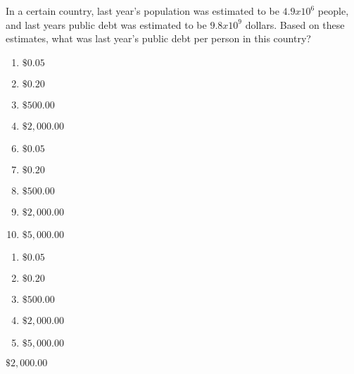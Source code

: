 In a certain country, last year's population was estimated to be $4.9x10^6$ people, and last years public debt was estimated to be $9.8x10^9$ dollars. Based on these estimates, what was last year's public debt per person in this country?

\ifsat
	\begin{enumerate}[label=\Alph*)]
		\item   $\$0.05$
		\item  $\$0.20$ 
		\item  $\$500.00$ 
		\item  $\$2,000.00$ %
	\end{enumerate}
\else
\fi

\ifacteven
	\begin{enumerate}[label=\textbf{\Alph*.},itemsep=\fill,align=left]
		\setcounter{enumii}{5}
		\item   $\$0.05$
		\item  $\$0.20$ 
		\item  $\$500.00$ 
		\addtocounter{enumii}{1}
		\item  $\$2,000.00$ %
		\item  $\$5,000.00$ 
	\end{enumerate}
\else
\fi

\ifactodd
	\begin{enumerate}[label=\textbf{\Alph*.},itemsep=\fill,align=left]
		\item   $\$0.05$
		\item  $\$0.20$ 
		\item  $\$500.00$ 
		\item  $\$2,000.00$ %
		\item  $\$5,000.00$ 
	\end{enumerate}
\else
\fi

\ifgridin
  $\$2,000.00$ %

\else
\fi

